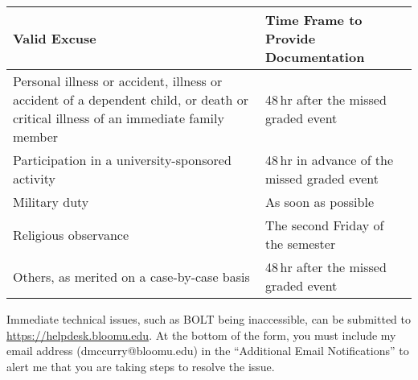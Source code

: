 \documentclass[11pt,letterpaper]{article}
\begin{document}
	\begin{center}
		\renewcommand\arraystretch{1.25}
\begin{tabularx}{\linewidth} {X X}
	\toprule
	\bfseries Valid Excuse & \bfseries Time Frame to Provide Documentation
	\\ \midrule
	Personal illness or accident, illness or accident of a dependent child,
	or death or critical illness of an immediate family member &
	48\,hr after the missed graded event \\
	Participation in a university-sponsored activity &
	48\,hr in advance of the missed graded event \\
	Military duty & As soon as possible \\
	Religious observance & The second Friday of the semester \\
	Others, as merited on a case-by-case basis & 48\,hr after the
	missed graded event \\
	\bottomrule
\end{tabularx}
\end{center}

Immediate technical issues, such as BOLT being inaccessible, can be submitted to
\url{https://helpdesk.bloomu.edu}. At the bottom of the form, you must include
my email address (dmccurry@bloomu.edu) in the ``Additional Email Notifications''
to alert me that you are taking steps to resolve the issue.
\end{document}
